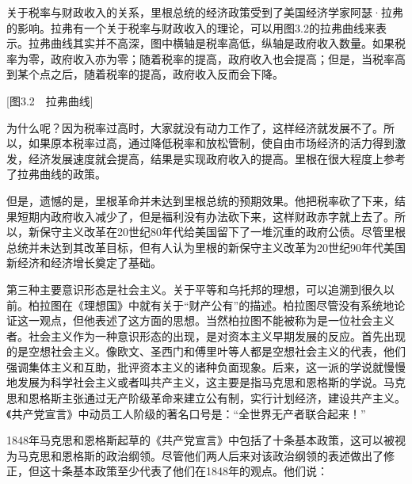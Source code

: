 关于税率与财政收入的关系，里根总统的经济政策受到了美国经济学家阿瑟·拉弗的影响。拉弗有一个关于税率与财政收入的理论，可以用图3.2的拉弗曲线来表示。拉弗曲线其实并不高深，图中横轴是税率高低，纵轴是政府收入数量。如果税率为零，政府收入亦为零；随着税率的提高，政府收入也会提高；但是，当税率高到某个点之后，随着税率的提高，政府收入反而会下降。

[图3.2　拉弗曲线]

为什么呢？因为税率过高时，大家就没有动力工作了，这样经济就发展不了。所以，如果原本税率过高，通过降低税率和放松管制，使自由市场经济的活力得到激发，经济发展速度就会提高，结果是实现政府收入的提高。里根在很大程度上参考了拉弗曲线的政策。

但是，遗憾的是，里根革命并未达到里根总统的预期效果。他把税率砍了下来，结果短期内政府收入减少了，但是福利没有办法砍下来，这样财政赤字就上去了。所以，新保守主义改革在20世纪80年代给美国留下了一堆沉重的政府公债。尽管里根总统并未达到其改革目标，但有人认为里根的新保守主义改革为20世纪90年代美国新经济和经济增长奠定了基础。


第三种主要意识形态是社会主义。关于平等和乌托邦的理想，可以追溯到很久以前。柏拉图在《理想国》中就有关于“财产公有”的描述。柏拉图尽管没有系统地论证这一观点，但他表述了这方面的思想。当然柏拉图不能被称为是一位社会主义者。社会主义作为一种意识形态的出现，是对资本主义早期发展的反应。首先出现的是空想社会主义。像欧文、圣西门和傅里叶等人都是空想社会主义的代表，他们强调集体主义和互助，批评资本主义的诸种负面现象。后来，这一派的学说就慢慢地发展为科学社会主义或者叫共产主义，这主要是指马克思和恩格斯的学说。马克思和恩格斯主张通过无产阶级革命来建立公有制，实行计划经济，建设共产主义。《共产党宣言》中动员工人阶级的著名口号是：“全世界无产者联合起来！”

1848年马克思和恩格斯起草的《共产党宣言》中包括了十条基本政策，这可以被视为马克思和恩格斯的政治纲领。尽管他们两人后来对该政治纲领的表述做出了修正，但这十条基本政策至少代表了他们在1848年的观点。他们说：


